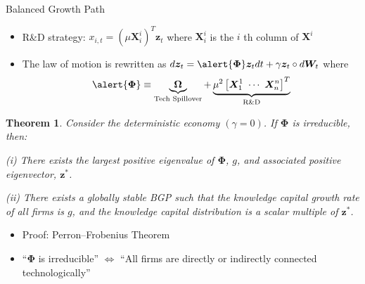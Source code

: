 \documentclass[
  10pt,
  aspectratio=169,   %
  handout           %
]{beamer}
\theoremstyle{plain}
\newtheorem*{thm*}{Theorem}
\begin{document}
\begin{frame}{Balanced Growth Path}
  \begin{itemize}
    \item R\&D strategy: $x_{i,t}=\left(\mu \bm{X}_{i}^{i}\right)^{T}\bm{z}_{t}$ where $\bm{X}_{i}^{i}$ is the $i$ th column of $\bm{X}^{i}$
    \item The law of motion is rewritten as $d\bm{z}_{t}=\alert{\bm{\Phi}}\bm{z}_{t}dt+\gamma\bm{z}_{t} \circ d\bm{W}_{t}$ where
    \[
      \alert{\bm{\Phi}}\equiv\underbrace{\bm{\Omega}}_{\text{Tech Spillover}}+\underbrace{\mu^{2}\left[\bm{X}_{1}^{1} \ \cdots \ \bm{X}_{n}^{n}\right]^{T}}_{\text{R\&D}}
    \]
    \vspace{-5mm}
  \end{itemize}
  \begin{thm*}
    Consider the deterministic economy $(\gamma=0)$. If \alert{$\bm{\Phi}$} is irreducible, then:

    (i) There exists the largest positive eigenvalue of \alert{$\bm{\Phi}$}, $g$, and associated positive eigenvector, $\bm{z}^{*}$.

    (ii) There exists a globally stable BGP such that the knowledge capital growth rate of all firms is $g$, and the knowledge capital distribution is a scalar multiple of $\bm{z}^{*}$.
  \end{thm*}
  \begin{itemize}
    \item Proof: Perron--Frobenius Theorem
    \item ``\alert{$\bm{\Phi}$} is irreducible'' $\Longleftrightarrow$ ``All firms are directly or indirectly connected technologically''
  \end{itemize}
\end{frame}
\end{document}
